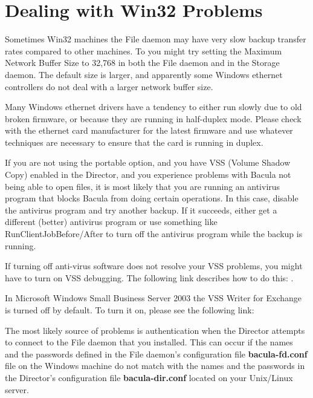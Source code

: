 \section{Dealing with Win32 Problems}
\label{problems}

Sometimes Win32 machines the File daemon may have very slow
backup transfer rates compared to other machines.  To you might
try setting the Maximum Network Buffer Size to 32,768 in both the
File daemon and in the Storage daemon. The default size is larger,
and apparently some Windows ethernet controllers do not deal with          
a larger network buffer size.

Many Windows ethernet drivers have a tendency to either run slowly 
due to old broken firmware, or because they are running in half-duplex
mode. Please check with the ethernet card manufacturer for the latest
firmware and use whatever techniques are necessary to ensure that the 
card is running in duplex.

If you are not using the portable option, and you have VSS
(Volume Shadow Copy) enabled in the Director, and you experience
problems with Bacula not being able to open files, it is most
likely that you are running an antivirus program that blocks
Bacula from doing certain operations. In this case, disable the
antivirus program and try another backup.  If it succeeds, either
get a different (better) antivirus program or use something like
RunClientJobBefore/After to turn off the antivirus program while
the backup is running.

If turning off anti-virus software does not resolve your VSS
problems, you might have to turn on VSS debugging.  The following
link describes how to do this:
.

In Microsoft Windows Small Business Server 2003 the VSS Writer for Exchange
is turned off by default. To turn it on, please see the following link:


The most likely source of problems is authentication when the Director
attempts to connect to the File daemon that you installed. This can occur if
the names and the passwords defined in the File daemon's configuration file
{\bf bacula-fd.conf} file on
the Windows machine do not match with the names and the passwords in the
Director's configuration file {\bf bacula-dir.conf} located on your Unix/Linux
server. 

